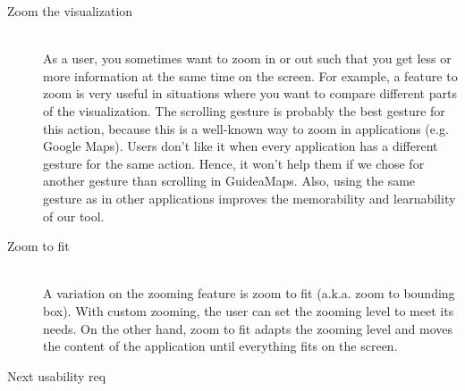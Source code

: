 \begin{description}
	\item[Zoom the visualization] \hfill \\
	As a user, you sometimes want to zoom in or out such that you get less or more information at the same time on the screen. For example, a feature to zoom is very useful in situations where you want to compare different parts of the visualization. The scrolling gesture is probably the best gesture for this action, because this is a well-known way to zoom in applications (e.g. Google Maps). Users don't like it when every application has a different gesture for the same action. Hence, it won't help them if we chose for another gesture than scrolling in GuideaMaps. Also, using the same gesture as in other applications improves the memorability and learnability of our tool.
	
	\item[Zoom to fit] \hfill \\
	A variation on the zooming feature is zoom to fit (a.k.a. zoom to bounding box). With custom zooming, the user can set the zooming level to meet its needs. On the other hand, zoom to fit adapts the zooming level and moves the content of the application until everything fits on the screen. 
	
	\item[Next usability req] \hfill \\
	
\end{description}




